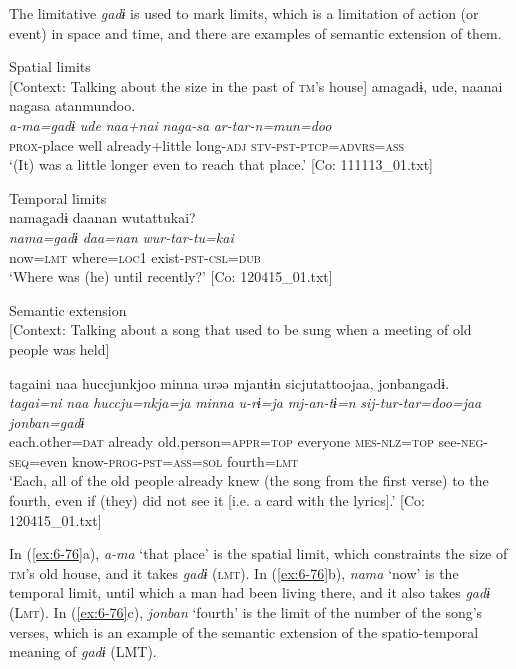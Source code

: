 The limitative \textit{gadɨ} is used to mark limits, which is a limitation of action (or event) in space and time, and there are examples of semantic extension of them.

\ea\label{ex:6-76}
\ea Spatial limits\\
  {}[Context: Talking about the size in the past of \textsc{tm}’s house]
{\TM}
\glll amagadɨ,  ude,  naanai  nagasa  atanmundoo.\\
\textit{a-ma=gadɨ}  \textit{ude}  \textit{naa+nai}  \textit{naga-sa}  \textit{ar-tar-n=mun=doo}\\
    \textsc{prox}-place  well  already+little  long-\textsc{adj}  \textsc{stv}-\textsc{pst}-\textsc{ptcp}=\textsc{advrs}=\textsc{ass}\\
\glt    ‘(It) was a little longer even to reach that place.’ [Co: 111113\_01.txt]

\ex Temporal limits\\
{\TM}
\glll namagadɨ  daanan  wutattukai?\\
\textit{nama=gadɨ}  \textit{daa=nan}  \textit{wur-tar-tu=kai}\\
    now=\textsc{lmt}  where=\textsc{loc1}  exist-\textsc{pst}-\textsc{csl}=\textsc{dub}\\
\glt    ‘Where was (he) until recently?’ [Co: 120415\_01.txt]
\z

\ex Semantic extension\\
  {}[Context: Talking about a song that used to be sung when a meeting of old people was held]

{\TM}
\glll {\textbar}tagaini{\textbar}  naa  huccjunkjoo  minna    urəə  mjantɨn  sicjutattoojaa,    {\textbar}jonban{\textbar}gadɨ.\\
\textit{tagai=ni}  \textit{naa}  \textit{huccju=nkja=ja}  \textit{minna}  \textit{u-rɨ=ja}  \textit{mj-an-tɨ=n}  \textit{sij-tur-tar=doo=jaa}    \textit{jonban=gadɨ}\\
    each.other=\textsc{dat}  already  old.person=\textsc{appr}=\textsc{top}  everyone    \textsc{mes}-\textsc{nlz}=\textsc{top}  see-\textsc{neg}-\textsc{seq}=even  know-\textsc{prog}-\textsc{pst}=\textsc{ass}=\textsc{sol} fourth=\textsc{lmt}\\
\glt    ‘Each, all of the old people already knew (the song from the first verse) to the fourth, even if (they) did not see it [i.e. a card with the lyrics].’ [Co: 120415\_01.txt]
\z

In (\ref{ex:6-76}a), \textit{a-ma} ‘that place’ is the spatial limit, which constraints the size of \textsc{tm}’s old house, and it takes \textit{gadɨ} (\textsc{lmt}). In (\ref{ex:6-76}b), \textit{nama} ‘now’ is the temporal limit, until which a man had been living there, and it also takes \textit{gadɨ} (L\textsc{mt}). In (\ref{ex:6-76}c), \textit{jonban} ‘fourth’ is the limit of the number of the song’s verses, which is an example of the semantic extension of the spatio-temporal meaning of \textit{gadɨ} (LMT).

